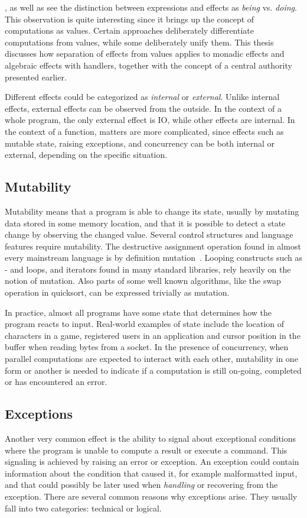 \textcite{imperative-fp}, as well as \textcite{do-be-do-be-do} see the distinction between expressions and effects as \emph{being} vs. \emph{doing}. This observation is quite interesting since it brings up the concept of computations as values. Certain approaches deliberately differentiate computations from values, while some deliberately unify them. This thesis discusses how separation of effects from values applies to monadic effects and algebraic effects with handlers, together with the concept of a central authority presented earlier.

Different effects could be categorized as \emph{internal} or \emph{external}. Unlike internal effects, external effects can be observed from the outside. In the context of a whole program, the only external effect is IO, while other effects are internal. In the context of a function, matters are more complicated, since effects such as mutable state, raising exceptions, and concurrency can be both internal or external, depending on the specific situation.


\subsection{Mutability} 
Mutability means that a program is able to change its state, usually by mutating data stored in some memory location, and that it is possible to detect a state change by observing the changed value. Several control structures and language features require mutability. The destructive assignment operation found in almost every mainstream language is by definition mutation~\cite[Chapter~3]{sicp}. Looping constructs such as - and  loops, and iterators found in many standard libraries, rely heavily on the notion of mutation. Also parts of some well known algorithms, like the swap operation in quicksort, can be expressed trivially as mutation.

In practice, almost all programs have some state that determines how the program reacts to input. Real-world examples of state include the location of characters in a game, registered users in an application and cursor position in the buffer when reading bytes from a socket. In the presence of concurrency, when parallel computations are expected to interact with each other, mutability in one form or another is needed to indicate if a computation is still on-going, completed or has encountered an error.


\subsection{Exceptions} \label{effect-types:exceptions}
Another very common effect is the ability to signal about exceptional conditions where the program is unable to compute a result or execute a command. This signaling is achieved by raising an error or exception. An exception could contain information about the condition that caused it, for example malformatted input, and that could possibly be later used when \emph{handling} or recovering from the exception. There are several common reasons why exceptions arise. They usually fall into two categories: technical or logical.~\cite{imprecise-exceptions}

